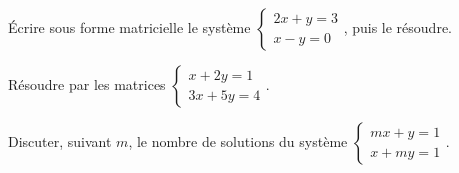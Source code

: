 \begin{entrainement}[systèmes]
\exo[\niveau{1}] Écrire sous forme matricielle le système
$\begin{cases} 2x+y = 3 \\ x-y = 0 \end{cases}$, puis le résoudre.

\exo[\niveau{2}] Résoudre par les matrices
$\begin{cases} x+2y = 1 \\ 3x+5y = 4 \end{cases}$.

\exo[\niveau{3}] Discuter, suivant $m$, le nombre de solutions du système
$\begin{cases} mx+y = 1 \\ x+my = 1 \end{cases}$.
\end{entrainement}

